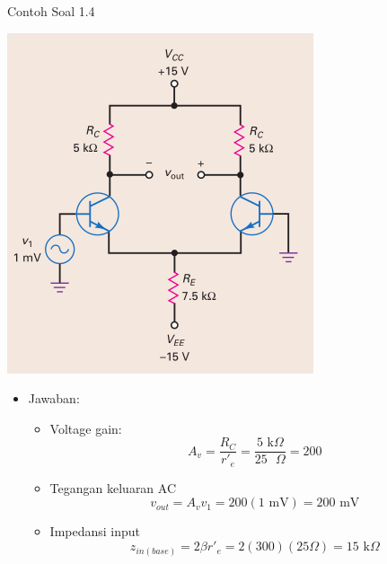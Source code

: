 \documentclass[aspectratio=169]{beamer}
\begin{document}
\begin{frame}{Contoh Soal 1.4}
	\begin{multicols}{2}
		\begin{center}
			\includegraphics[height=0.7\textheight]{gambar/01.contoh_soal_1-2}
		\end{center}
		\columnbreak
		\begin{itemize}
			\item Jawaban:
			\begin{itemize}
				\item Voltage gain:
				\[ A_v = \frac{R_C}{r'_e} = \frac{5 \text{ k}\Omega }{25 \text{ }\Omega } = 200 \]
				\item Tegangan keluaran AC
				\[ v_{out} = A_v v_1 = 200(1 \text{ mV}) = 200 \text{ mV} \]
				\item Impedansi input
				\[ z_{in(base)} = 2 \beta r'_e = 2(300)(25\Omega) = 15 \text{ k}\Omega\]
			\end{itemize}
		\end{itemize}
	\end{multicols}
\end{frame}
\end{document}
